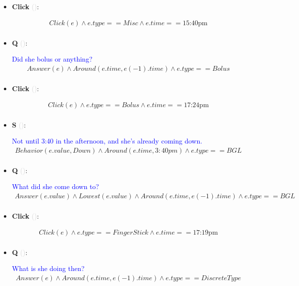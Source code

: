 \documentclass[11pt]{article}
\newcounter{CQ}
\newcounter{CS}
\newcounter{CClick}
\newcommand{\key}[1]{\textcolor{lightgray}{#1}}
\begin{document}
\begin{itemize}
	
	\item
	\textbf{Click\theCClick} \key{()}: \addtocounter{CClick}{1}
	\begin{multline*}
	Click(e) \wedge e.type == Misc \wedge e.time == \mbox{15:40pm} \\
	\end{multline*}
	
	\item
	\textbf{Q\theCQ} \key{()}: \addtocounter{CQ}{1}
	\textcolor{blue}{ Did she bolus or anything? }
	\begin{multline*}
	Answer(e) \wedge Around(e.time, e(-1).time) \wedge e.type == Bolus  \\
	\end{multline*}
	
	\item
	\textbf{Click\theCClick} \key{()}: \addtocounter{CClick}{1}
	\begin{multline*}
	Click(e) \wedge e.type == Bolus \wedge e.time == \mbox{17:24pm} \\
	\end{multline*}
	
	\item
	\textbf{S\theCS} \key{()}: \addtocounter{CS}{1}
	\textcolor{blue}{ Not until 3:40 in the afternoon, and she's already coming down. }
	\begin{multline*}
	Behavior(e.value, Down) \wedge Around(e.time, 3:40pm) \wedge e.type==BGL \\
	\end{multline*}
	
	\item
	\textbf{Q\theCQ} \key{()}: \addtocounter{CQ}{1}
	\textcolor{blue}{ What did she come down to? }
	\begin{multline*}
    Answer(e.value) \wedge Lowest(e.value) \wedge Around(e.time, e(-1).time) \wedge e.type==BGL \\
	\end{multline*}
	
	\item
	\textbf{Click\theCClick} \key{()}: \addtocounter{CClick}{1}
	\begin{multline*}
	Click(e) \wedge e.type == FingerStick \wedge e.time == \mbox{17:19pm} \\
	\end{multline*}
	
	\item
	\textbf{Q\theCQ} \key{()}: \addtocounter{CQ}{1}
	\textcolor{blue}{ What is she doing then? }
	\begin{multline*}
    Answer(e) \wedge Around(e.time, e(-1).time) \wedge e.type == DiscreteType \\ 
	\end{multline*}
	


\end{itemize}
\end{document}
